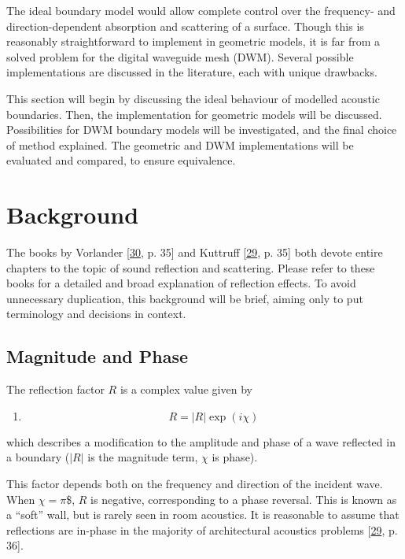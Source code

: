 \documentclass[]{scrreprt}
\providecommand{\tightlist}{%
  \setlength{\itemsep}{0pt}\setlength{\parskip}{0pt}}
\begin{document}
The ideal boundary model would allow complete control over the
frequency- and direction-dependent absorption and scattering of a
surface. Though this is reasonably straightforward to implement in
geometric models, it is far from a solved problem for the digital
waveguide mesh (DWM). Several possible implementations are discussed in
the literature, each with unique drawbacks.

This section will begin by discussing the ideal behaviour of modelled
acoustic boundaries. Then, the implementation for geometric models will
be discussed. Possibilities for DWM boundary models will be
investigated, and the final choice of method explained. The geometric
and DWM implementations will be evaluated and compared, to ensure
equivalence.

\section{Background}\label{background-5}

The books by Vorlander
{[}\protect\hyperlink{ref-vorlanderux5fauralization:ux5f2007}{30}, p.
35{]} and Kuttruff
{[}\protect\hyperlink{ref-kuttruffux5froomux5f2009}{29}, p. 35{]} both
devote entire chapters to the topic of sound reflection and scattering.
Please refer to these books for a detailed and broad explanation of
reflection effects. To avoid unnecessary duplication, this background
will be brief, aiming only to put terminology and decisions in context.

\subsection{Magnitude and Phase}\label{magnitude-and-phase}

The reflection factor \(R\) is a complex value given by

\begin{enumerate}
\def\labelenumi{(\arabic{enumi})}
\setcounter{enumi}{33}
\tightlist
\item
  \[R=|R|\exp(i\chi)\]
\end{enumerate}

which describes a modification to the amplitude and phase of a wave
reflected in a boundary (\(|R|\) is the magnitude term, \(\chi\) is
phase).

This factor depends both on the frequency and direction of the incident
wave. When \(\chi = \pi\)\$, \(R\) is negative, corresponding to a phase
reversal. This is known as a ``soft'' wall, but is rarely seen in room
acoustics. It is reasonable to assume that reflections are in-phase in
the majority of architectural acoustics problems
{[}\protect\hyperlink{ref-kuttruffux5froomux5f2009}{29}, p. 36{]}.
\end{document}

